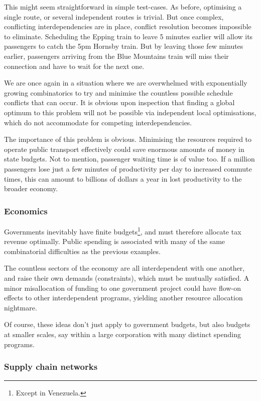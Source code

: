This might seem straightforward in simple test-cases. As before, optimising a single route, or several independent routes is trivial. But once complex, conflicting interdependencies are in place, conflict resolution becomes impossible to eliminate. Scheduling the Epping train to leave 5 minutes earlier will allow its passengers to catch the 5pm Hornsby train. But by leaving those few minutes earlier, passengers arriving from the Blue Mountains train will miss their connection and have to wait for the next one.

We are once again in a situation where we are overwhelmed with exponentially growing combinatorics to try and minimise the countless possible schedule conflicts that can occur. It is obvious upon inspection that finding a global optimum to this problem will not be possible via independent local optimisations, which do not accommodate for competing interdependencies. 

The importance of this problem is obvious. Minimising the resources required to operate public transport effectively could save enormous amounts of money in state budgets. Not to mention, passenger waiting time is of value too. If a million passengers lose just a few minutes of productivity per day to increased commute times, this can amount to billions of dollars a year in lost productivity to the broader economy.

\subsubsection{Economics}

Governments inevitably have finite budgets\footnote{Except in Venezuela.}, and must therefore allocate tax revenue optimally. Public spending is associated with many of the same combinatorial difficulties as the previous examples.

The countless sectors of the economy are all interdependent with one another, and raise their own demands (constraints), which must be mutually satisfied. A minor misallocation of funding to one government project could have flow-on effects to other interdependent programs, yielding another resource allocation nightmare.

Of course, these ideas don't just apply to government budgets, but also budgets at smaller scales, say within a large corporation with many distinct spending programs.

\subsubsection{Supply chain networks}

